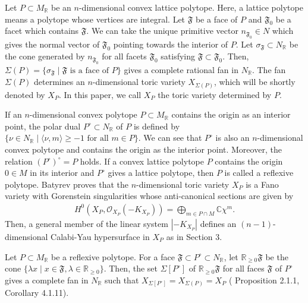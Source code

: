 \documentclass[10pt]{article}
\begin{document}
Let  $P \subset M_\mathbb{R}$ be an  $n$-dimensional  convex lattice polytope.
Here, a lattice polytope means a polytope whose vertices are integral.
Let $\mathfrak{F}$ be a face of $P$ and $\mathfrak{F}_0$ be a facet which contains $\mathfrak{F}$.
We can take the unique primitive vector $n_{\mathfrak{F}_0} \in N$ which gives the normal vector of $\mathfrak{F}_0$
 pointing towards the interior of $P$.
Let $\sigma_{\mathfrak{F}}\subset N_\mathbb{R}$ be the cone generated by $n_{\mathfrak{F}_0}$ for all facets  $\mathfrak{F}_0$ satisfying   $\mathfrak{F} \subset \mathfrak{F}_0.$
Then,
$
\Sigma(P)=\{\sigma_\mathfrak{F} \mid \mathfrak{F} \text{ is a face of } P\}
$
gives a complete rational fan in $N_\mathbb{R}$.
The fan $\Sigma(P)$ determines an $n$-dimensional toric variety $X_{\Sigma(P)}$,
which will be shortly denoted by  $X_P$.
In this paper,
we call $X_P$ the toric 
variety determined by  $P$.


If an $n$-dimensional convex polytope $P\subset M_\mathbb{R}$ contains the origin as an interior point, 
the polar dual $P^\circ \subset N_\mathbb{R}$ of $P$ is defined by $\{\nu\in N_\mathbb{R}\mid\langle \nu,m\rangle \geq -1 \text{ for all } m\in P \}$.
We can see that 
$P^\circ$ is also  an $n$-dimensional convex polytope and contains the origin as the interior point.
Moreover, the relation $(P^\circ)^\circ =P$ holds.
If a convex lattice polytope $P$ contains the origin $0\in M$ in its interior and $P^\circ$ gives a lattice polytope,
then $P$ is called a reflexive polytope. 
Batyrev \cite{B} proves that 
the $n$-dimensional toric variety $X_P$ is a Fano variety with Gorenstein singularities 
whose anti-canonical sections are given by
\begin{align}\label{LatticePtsGenerators}
H^0(X_P, \mathcal{O}_{X_P} (-K_{X_P}) ) =\bigoplus_{m\in P\cap M} \mathbb{C} \chi^m.
\end{align}
Then, a general member of the linear system $|-K_{X_P}|$ defines an $(n-1)$-dimensional Calabi-Yau hypersurface in $X_P$ as in \cite{B} Section 3.

Let $P\subset M_\mathbb{R}$ be a reflexive polytope.
For a face $\mathfrak{F}\subset P^\circ \subset N_\mathbb{R}$, let $\mathbb{R}_{\geq 0} \mathfrak{F}$ be the cone $\{\lambda x\mid x\in \mathfrak{F}, \lambda \in \mathbb{R}_{\geq 0}  \}$.   
Then, the set $\Sigma[P^\circ]$ of $\mathbb{R}_{\geq 0} \mathfrak{F}$ for all faces $\mathfrak{F}$ of $P^\circ$ gives a complete fan in $N_\mathbb{R}$ such that
$X_{\Sigma[P^\circ]} = X_{\Sigma(P)}=X_P$
(\cite{B} Proposition 2.1.1, Corollary 4.1.11).
\end{document}
